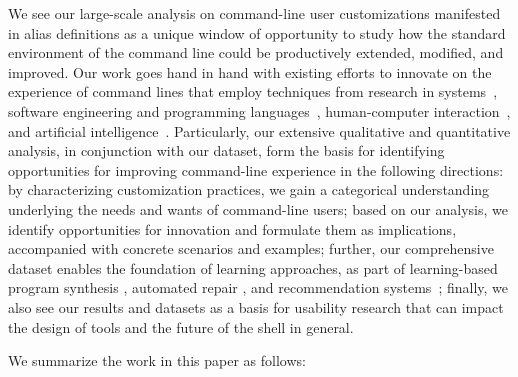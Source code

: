 \documentclass[sigconf,nonacm,screen]{acmart}
\begin{document}
We see our large-scale analysis on command-line user customizations manifested in alias definitions as a unique window of opportunity to study how the standard environment of the command line could be productively extended, modified, and improved. 
Our work goes hand in hand with existing efforts to innovate on the experience of command lines that employ techniques from research in systems~\citep{posh, odfg}, software engineering and programming languages~\citep{pash, kumquat, dantoni:17}, human-computer interaction~\citep{bespoke:19, gandhi2020}, and artificial intelligence~\citep{clai, nl2bash, findcmd}.
Particularly, our extensive qualitative and quantitative analysis, in conjunction with our dataset, form the basis for identifying opportunities for improving command-line experience in the following directions: by characterizing customization practices, we gain a categorical understanding underlying the needs and wants of command-line users; based on our analysis, we identify opportunities for innovation and formulate them as implications, accompanied with concrete scenarios and examples; %
further, our comprehensive dataset enables the foundation of learning approaches, as part of learning-based program synthesis \citep{bruch:09,raychev2014completion}, automated repair \citep{monperrus:18}, and recommendation systems~\citep{mens2014source};
finally, we also see our results and datasets as a basis for usability research that can impact the design of tools and the future of the shell in general.


We summarize the work in this paper as follows:
\end{document}
